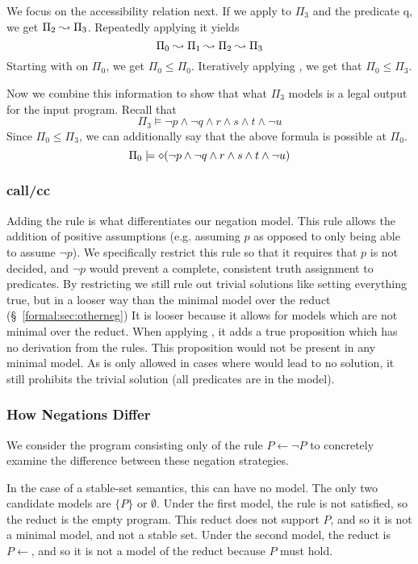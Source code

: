 We focus on the accessibility relation next.
If we apply  to $\Pi_3$ and the predicate q, we get $\Pi_2 \leadsto \Pi_3$.
Repeatedly applying it yields
\[
	\Pi_0 \leadsto \Pi_1 \leadsto \Pi_2 \leadsto \Pi_3
\]
Starting with  on $\Pi_0$, we get $\Pi_0 \leq \Pi_0$.
Iteratively applying , we get that $\Pi_0 \leq \Pi_3$.

Now we combine this information to show that what $\Pi_3$ models is a legal output for the input program.
Recall that
\[
	\Pi_3 \models \neg p \wedge \neg q \wedge r \wedge s \wedge t \wedge \neg u
\]
Since $\Pi_0 \leq \Pi_3$, we can additionally say that the above formula is possible at $\Pi_0$.
\[
	\Pi_0 \models \diamond (\neg p \wedge \neg q \wedge r \wedge s \wedge t \wedge \neg u)
\]

\subsubsection{call/cc}
Adding the  rule is what differentiates our negation model.
This rule allows the addition of positive assumptions (e.g. assuming $p$ as opposed to only being able to assume $\neg p$).
We specifically restrict this rule so that it requires that $p$ is not decided, and $\neg p$ would prevent a complete, consistent truth assignment to predicates.
By restricting  we still rule out trivial solutions like setting everything true, but in a looser way than the minimal model over the reduct (\S~\ref{formal:sec:otherneg})
It is looser because it allows for models which are not minimal over the reduct.
When applying , it adds a true proposition which has no derivation from the rules.
This proposition would not be present in any minimal model.
As  is only allowed in cases where  would lead to no solution, it still prohibits the trivial solution (all predicates are in the model).

\subsubsection{How Negations Differ}
We consider the program consisting only of the rule $P \leftarrow \neg P$ to concretely examine the difference between these negation strategies.

In the case of a stable-set semantics, this can have no model.
The only two candidate models are $\{P\}$ or $\emptyset$.
Under the first model, the rule is not satisfied, so the reduct is the empty program.
This reduct does not support $P$, and so it is not a minimal model, and not a stable set.
Under the second model, the reduct is $P \leftarrow$, and so it is not a model of the reduct because $P$ must hold.

